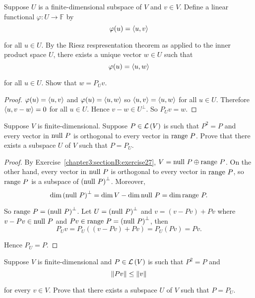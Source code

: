 \begin{exercise}
    Suppose $U$ is a finite-dimensional subspace of $V$ and $v\in V$. Define a linear functional $\varphi: U\to \mathbb{F}$ by
    \[
        \varphi(u) = \left\langle{u, v}\right\rangle
    \]

    for all $u\in U$. By the Riesz respresentation theorem as applied to the inner product space $U$, there exists a unique vector $w\in U$ such that
    \[
        \varphi(u) = \left\langle{u, w}\right\rangle
    \]

    for all $u\in U$. Show that $w = P_{U}v$.
\end{exercise}

\begin{proof}
    $\varphi(u) = \left\langle{u, v}\right\rangle$ and $\varphi(u) = \left\langle{u, w}\right\rangle$ so $\left\langle{u, v}\right\rangle = \left\langle{u, w}\right\rangle$ for all $u\in U$. Therefore $\left\langle{u, v - w}\right\rangle = 0$ for all $u\in U$. Hence $v - w\in U^{\bot}$. So $P_{U}v = w$.
\end{proof}
\newpage

\begin{exercise}
    Suppose $V$ is finite-dimensional. Suppose $P \in \mathcal{L}\left({V}\right)$ is such that $P^{2} = P$ and every vector in $\operatorname{null}\,{P}$ is orthogonal to every vector in $\operatorname{range}\,{P}$. Prove that there exists a subspace $U$ of $V$ such that $P = P_{U}$.
\end{exercise}

\begin{proof}
    By Exercise~\ref{chapter3:sectionB:exercise27}, $V = \operatorname{null}\,{P}\oplus \operatorname{range}\,{P}$. On the other hand, every vector in $\operatorname{null}\,{P}$ is orthogonal to every vector in $\operatorname{range}\,{P}$, so $\operatorname{range}\,{P}$ is a subspace of ${(\operatorname{null}\,{P})}^{\bot}$. Moreover,
    \[
        \dim {(\operatorname{null}\,{P})}^{\bot} = \dim V - \dim\operatorname{null}\,{P} = \dim\operatorname{range}\,{P}.
    \]

    So $\operatorname{range}\,{P} = {(\operatorname{null}\,{P})}^{\bot}$. Let $U = {(\operatorname{null}\,{P})}^{\bot}$ and $v = (v - Pv) + Pv$ where $v - Pv\in\operatorname{null}\,{P}$ and $Pv\in\operatorname{range}\,{P} = {(\operatorname{null}\,{P})}^{\bot}$, then
    \[
        P_{U}v = P_{U}((v - Pv) + Pv) = P_{U}(Pv) = Pv.
    \]

    Hence $P_{U} = P$.
\end{proof}
\newpage

\begin{exercise}
    Suppose $V$ is finite-dimensional and $P \in \mathcal{L}\left({V}\right)$ is such that $P^{2} = P$ and
    \[
        \left\Vert{Pv}\right\Vert \leq \left\Vert{v}\right\Vert
    \]

    for every $v\in V$. Prove that there exists a subspace $U$ of $V$ such that $P = P_{U}$.
\end{exercise}

